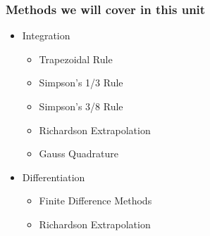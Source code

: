 \documentclass{if-beamer}
\begin{document}
\begin{frame}
	\frametitle{Methods we will cover in this unit}
	\begin{itemize}
		\item Integration \\\vspace{4pt}
		\begin{itemize}
			\item Trapezoidal Rule\\\vspace{4pt}
			\item Simpson's 1/3 Rule\\\vspace{4pt}
			\item Simpson's 3/8 Rule\\\vspace{4pt}
			\item Richardson Extrapolation\\\vspace{4pt}
			\item Gauss Quadrature\\\vspace{4pt}
		\end{itemize}
		\item Differentiation\\\vspace{4pt}
		\begin{itemize}
			\item Finite Difference Methods\\\vspace{4pt}
			\item Richardson Extrapolation\\\vspace{4pt}
		\end{itemize}
	\end{itemize}
\end{frame}
\end{document}
